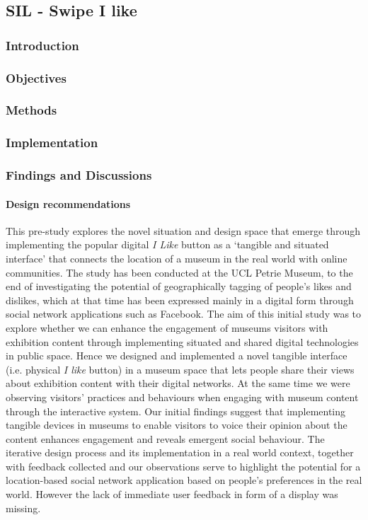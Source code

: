 \subsection{SIL - Swipe I like}


\subsubsection {Introduction} 
\subsubsection {Objectives} 
\subsubsection {Methods}
\subsubsection {Implementation}
\subsubsection {Findings and Discussions}
\paragraph{Design recommendations}

This pre-study explores the novel situation and design space that emerge through implementing the popular digital \textit{I Like} button as a ‘tangible and situated interface’ that connects the location of a museum in the real world with online communities. 
The study has been conducted at the UCL Petrie Museum, to the end of investigating the potential of geographically tagging of people’s likes and dislikes, which at that time has been expressed mainly in a digital form through social network applications such as Facebook. 
The aim of this initial study was to explore whether we can enhance the engagement of museums visitors with exhibition content through implementing situated and shared digital technologies in public space. 
Hence we designed and implemented a novel tangible interface (i.e. physical \textit{I like} button) in a museum space that lets people share their views about exhibition content with their digital networks. At the same time we were observing visitors' practices and behaviours when engaging with museum content through the interactive system. 
Our initial findings suggest that implementing tangible devices in museums to enable visitors to voice their opinion about the content enhances engagement and reveals emergent social behaviour. 
The iterative design process and its implementation in a real world context, together with feedback collected and our observations serve to highlight the potential for a location-based social network application based on people’s preferences in the real world.
However the lack of immediate user feedback in form of a display was missing.


